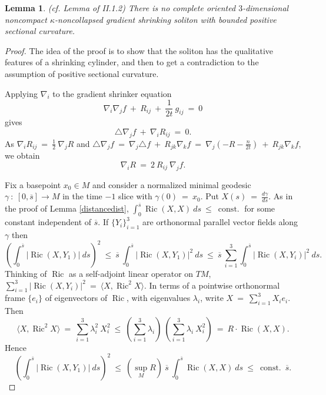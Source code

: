 \documentclass[12pt]{amsart}
\newcommand{\const}{\operatorname{const.}}
\newcommand{\Ric}{\operatorname{Ric}}
\numberwithin{equation}{section}
\theoremstyle{plain}
\newtheorem{lemma}[equation]{Lemma}
\theoremstyle{definition}
\theoremstyle{remark}
\begin{document}
\begin{lemma} \label{nosoliton} (cf. Lemma of II.1.2)
There is no complete oriented $3$-dimensional noncompact
$\kappa$-noncollapsed gradient shrinking soliton with 
bounded positive sectional curvature.
\end{lemma}
\begin{proof}
The idea of the proof is to show that the soliton has the qualitative
features of a shrinking cylinder, and then to get a contradiction to
the assumption of positive sectional curvature.

Applying $\nabla_i$ to the gradient shrinker equation
\begin{equation} \label{IIeqn}
\nabla_i \nabla_j f \: + \: R_{ij} \: + \: \frac{1}{2t} \: g_{ij}
\: = \: 0
\end{equation}
gives
\begin{equation}
\triangle \nabla_j f \: + \: \nabla_i R_{ij} \: = \: 0.
\end{equation}
As $\nabla_i R_{ij} \: = \: \frac{1}{2} \: \nabla_j R$ and
$\triangle \nabla_j f \: = \: \nabla_j \triangle f \: + \:
R_{jk} \nabla_k f \: = \: \nabla_j \left( -R-\frac{n}{2t} \right) \: + \: 
R_{jk} \nabla_k f$, 
we obtain
\begin{equation} \label{gradR}
\nabla_i R \: = \: 2 \: R_{ij} \: \nabla_j f.
\end{equation}

Fix a basepoint $x_0 \in M$ and consider a normalized minimal geodesic
$\gamma \: : \: [0, \overline{s}] \rightarrow M$ in the time $-1$ slice
with $\gamma(0) \: = \: x_0$. Put $X(s) \: = \: \frac{d\gamma}{ds}$.
As in the proof of Lemma \ref{distancedist},
$\int_0^{\overline{s}} \Ric(X, X) \: ds \: \le \:
\const$ for some constant independent of $\overline{s}$.
If $\{Y_i\}_{i=1}^3$ are orthonormal parallel vector fields along $\gamma$
then
\begin{equation}
\left( \int_0^{\overline{s}} |\Ric(X, Y_1)| \: ds \right)^2 \: \le \:
\overline{s} \: \int_0^{\overline{s}} |\Ric(X, Y_1)|^2 \: ds \: \le \:
\overline{s} \: \sum_{i=1}^3 \int_0^{\overline{s}} |\Ric(X, Y_i)|^2 \: ds.
\end{equation}
Thinking of $\Ric$ as a self-adjoint linear operator on $TM$, 
$\sum_{i=1}^3 |\Ric(X, Y_i)|^2 \: = \: \langle X, \Ric^2 X \rangle$.
In terms of a pointwise orthonormal frame  $\{e_i\}$
of eigenvectors of $\Ric$,
with eigenvalues $\lambda_i$, write $X \: = \: \sum_{i=1}^3 X_i e_i$.
Then 
\begin{equation}
\langle X, \Ric^2 X \rangle \: = \: \sum_{i=1}^3 \lambda_i^2 \: X_i^2 
\: \le \: (\sum_{i=1}^3 \lambda_i) \: (\sum_{i=1}^3 \lambda_i \: X_i^2) 
\: = \: R \cdot \Ric(X, X). 
\end{equation}
Hence
\begin{equation}
\left( \int_0^{\overline{s}} |\Ric(X, Y_1)| \: ds \right)^2 \: \le \: 
(\sup_M R) \: \overline{s} \: 
\int_0^{\overline{s}} \Ric(X, X) \: ds \: \le \:
\const \: \overline{s}.
\end{equation}


\end{proof}
\end{document}

